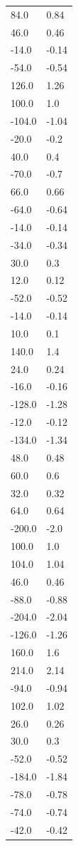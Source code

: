 \begin{longtable}{ll}
84.0 & 0.84 \\
46.0 & 0.46 \\
-14.0 & -0.14 \\
-54.0 & -0.54 \\
126.0 & 1.26 \\
100.0 & 1.0 \\
-104.0 & -1.04 \\
-20.0 & -0.2 \\
40.0 & 0.4 \\
-70.0 & -0.7 \\
66.0 & 0.66 \\
-64.0 & -0.64 \\
-14.0 & -0.14 \\
-34.0 & -0.34 \\
30.0 & 0.3 \\
12.0 & 0.12 \\
-52.0 & -0.52 \\
-14.0 & -0.14 \\
10.0 & 0.1 \\
140.0 & 1.4 \\
24.0 & 0.24 \\
-16.0 & -0.16 \\
-128.0 & -1.28 \\
-12.0 & -0.12 \\
-134.0 & -1.34 \\
48.0 & 0.48 \\
60.0 & 0.6 \\
32.0 & 0.32 \\
64.0 & 0.64 \\
-200.0 & -2.0 \\
100.0 & 1.0 \\
104.0 & 1.04 \\
46.0 & 0.46 \\
-88.0 & -0.88 \\
-204.0 & -2.04 \\
-126.0 & -1.26 \\
160.0 & 1.6 \\
214.0 & 2.14 \\
-94.0 & -0.94 \\
102.0 & 1.02 \\
26.0 & 0.26 \\
30.0 & 0.3 \\
-52.0 & -0.52 \\
-184.0 & -1.84 \\
-78.0 & -0.78 \\
-74.0 & -0.74 \\
-42.0 & -0.42 \\

\end{longtable}
